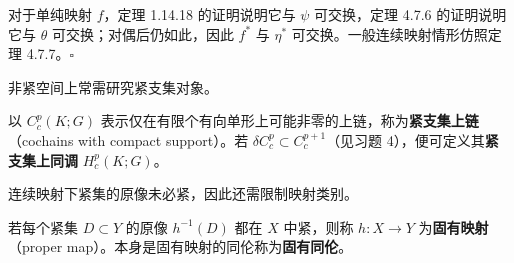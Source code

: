 对于单纯映射 $f$，定理 1.14.18 的证明说明它与 $\psi$ 可交换，定理 4.7.6 的证明说明它与 $\theta$ 可交换；对偶后仍如此，因此 $f^*$ 与 $\eta^*$ 可交换。一般连续映射情形仿照定理 4.7.7。\hfill$\square$

非紧空间上常需研究紧支集对象。

以 $C_c^p(K;G)$ 表示仅在有限个有向单形上可能非零的上链，称为\textbf{紧支集上链}（cochains with compact support）。若 $\delta C_c^p\subset C_c^{p+1}$（见习题 4），便可定义其\textbf{紧支集上同调} $H_c^p(K;G)$。

连续映射下紧集的原像未必紧，因此还需限制映射类别。

若每个紧集 $D\subset Y$ 的原像 $h^{-1}(D)$ 都在 $X$ 中紧，则称 $h:X\to Y$ 为\textbf{固有映射}（proper map）。本身是固有映射的同伦称为\textbf{固有同伦}。

